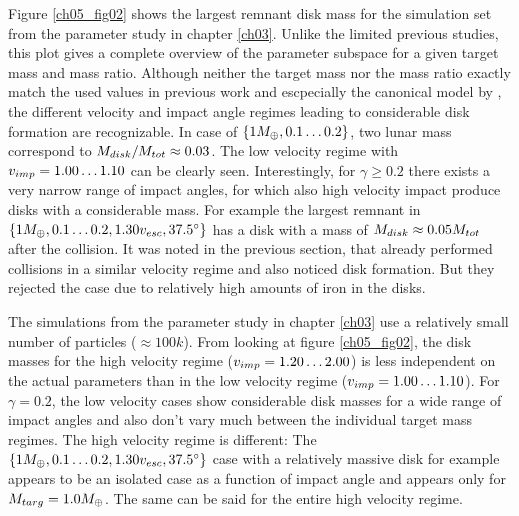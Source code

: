 
Figure \ref{ch05_fig02} shows the largest remnant disk mass for the simulation set \css from the parameter study in chapter \ref{ch03}. Unlike the limited previous studies, this plot gives a complete overview of the parameter subspace for a given target mass and mass ratio. Although neither the target mass nor the mass ratio exactly match the used values in previous work and escpecially the canonical model by \cite{Canup:2001p1861}, the different velocity and impact angle regimes leading to considerable disk formation are recognizable. In case of $\{ 1 M_{\oplus}, 0.1 \dots 0.2 \}$, two lunar mass correspond to $M_{disk} / M_{tot} \approx 0.03$. The low velocity regime with $v_{imp} = 1.00 \dots 1.10$ can be clearly seen. Interestingly, for $\gamma \ge 0.2$ there exists a very narrow range of impact angles, for which also high velocity impact produce disks with a considerable mass. For example the largest remnant in $\{ 1 M_{\oplus}, 0.1 \dots 0.2, 1.30 v_{esc}, 37.5 ^\circ \}$ has a disk with a mass of $M_{disk} \approx 0.05 M_{tot}$ after the collision. It was noted in the previous section, that \cite{Benz:1989p1893} already performed collisions in a similar velocity regime and also noticed disk formation. But they rejected the case due to relatively high amounts of iron in the disks.

The simulations from the parameter study in chapter \ref{ch03} use a relatively small number of particles ($\approx 100k$). From looking at figure \ref{ch05_fig02}, the disk masses for the high velocity regime ($v_{imp} = 1.20 \dots 2.00$) is less independent on the actual parameters than in the low velocity regime ($v_{imp} = 1.00 \dots 1.10$). For $\gamma = 0.2$, the low velocity cases show considerable disk masses for a wide range of impact angles and also don't vary much between the individual target mass regimes. The high velocity regime is different: The $\{ 1 M_{\oplus}, 0.1 \dots 0.2, 1.30 v_{esc}, 37.5 ^\circ \}$ case with a relatively massive disk for example appears to be an isolated case as a function of impact angle and appears only for $M_{targ} = 1.0 M_{\oplus}$. The same can be said for the entire high velocity regime. 

